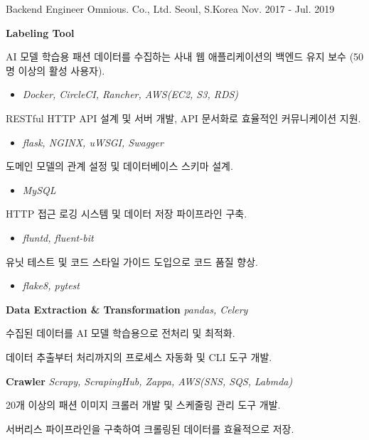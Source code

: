\begin{cventries}
  \cventry
    {Backend Engineer} %
    {Omnious. Co., Ltd.} %
    {Seoul, S.Korea} %
    {Nov. 2017 - Jul. 2019} %
    {
      \begin{cvitems} %
        \item[] {\textbf{Labeling Tool}}
        \item {AI 모델 학습용 패션 데이터를 수집하는 사내 웹 애플리케이션의 백엔드 유지 보수 (50명 이상의 활성 사용자).}
        \begin{itemize}
          \item[] \textit{Docker, CircleCI, Rancher, AWS(EC2, S3, RDS)}
        \end{itemize}
        \item {RESTful HTTP API 설계 및 서버 개발, API 문서화로 효율적인 커뮤니케이션 지원.}
        \begin{itemize}
          \item[] \textit{flask, NGINX, uWSGI, Swagger}
        \end{itemize}
        \item {도메인 모델의 관계 설정 및 데이터베이스 스키마 설계.}
        \begin{itemize}
          \item[] \textit{MySQL}
        \end{itemize}
        \item {HTTP 접근 로깅 시스템 및 데이터 저장 파이프라인 구축.}
        \begin{itemize}
          \item[] \textit{fluntd, fluent-bit}
        \end{itemize}
        \item {유닛 테스트 및 코드 스타일 가이드 도입으로 코드 품질 향상.}
        \begin{itemize}
          \item[] \textit{flake8, pytest}
        \end{itemize}
        \item[]
        \item[] {\textbf{Data Extraction \& Transformation} \hspace{1cm} \textit{pandas, Celery}}
        \item {수집된 데이터를 AI 모델 학습용으로 전처리 및 최적화.}
        \item {데이터 추출부터 처리까지의 프로세스 자동화 및 CLI 도구 개발.}
        \item[]
        \item[] {\textbf{Crawler} \hspace{1cm} \textit{Scrapy, ScrapingHub, Zappa, AWS(SNS, SQS, Labmda)}}
        \item {20개 이상의 패션 이미지 크롤러 개발 및 스케줄링 관리 도구 개발.} 
        \item {서버리스 파이프라인을 구축하여 크롤링된 데이터를 효율적으로 저장.}
        \item[]
      \end{cvitems}
    }


\end{cventries}
